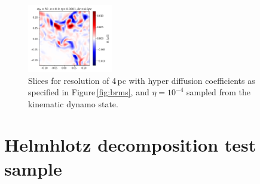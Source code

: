 \documentclass[preprint2]{aastex63}
\begin{document}
\begin{figure}
\includegraphics[trim=0.0cm 0.00cm 0.0cm 0.0cm,clip=true,width=0.33\textwidth]{csc_figs/bb14pcPm0e-4_032.png}
\caption{
Slices for resolution of 4\,pc with hyper diffusion coefficients as 
specified in Figure\,\ref{fig:brms}, and $\eta=10^{-4}$ sampled from the 
kinematic dynamo state.
\label{fig:4pcUB}
}
\end{figure}

\section{Helmhlotz decomposition test sample}
\end{document}
